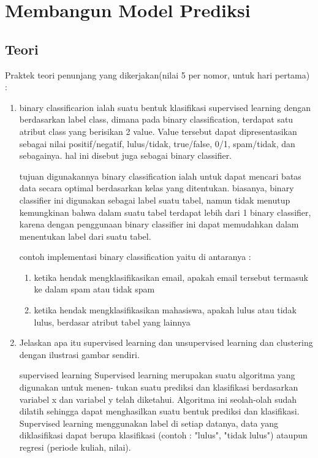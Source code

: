 \chapter{Membangun Model Prediksi}

\section{Teori}
Praktek teori penunjang yang dikerjakan(nilai 5 per nomor, untuk hari pertama) :
\begin{enumerate}
\item
binary classificarion ialah suatu bentuk klasifikasi supervised learning dengan berdasarkan label class, dimana pada binary classification, terdapat satu atribut class yang berisikan 2 value. Value tersebut dapat dipresentasikan sebagai nilai positif/negatif, lulus/tidak, true/false, 0/1, spam/tidak, dan sebagainya. hal ini disebut juga sebagai binary classifier.
\par tujuan digunakannya binary classification ialah untuk dapat mencari batas data secara optimal berdasarkan kelas yang ditentukan. biasanya, binary classifier ini digunakan sebagai label suatu tabel, namun tidak menutup kemungkinan bahwa dalam suatu tabel terdapat lebih dari 1 binary classifier, karena dengan penggunaan binary classifier ini dapat memudahkan dalam menentukan label dari suatu tabel.
\par contoh implementasi binary classification yaitu di antaranya :
\begin{enumerate}
    \item ketika hendak mengklasifikasikan email, apakah email tersebut termasuk ke dalam spam atau tidak spam
    \item ketika hendak mengklasifikasikan mahasiswa, apakah lulus atau tidak lulus, berdasar atribut tabel yang lainnya
\end{enumerate}
\item
Jelaskan apa itu supervised learning dan unsupervised learning dan clustering dengan ilustrasi gambar sendiri.
\par supervised learning
Supervised learning merupakan suatu algoritma yang digunakan untuk menen-
tukan suatu prediksi dan klasifikasi berdasarkan variabel x dan variabel y telah
diketahui. Algoritma ini seolah-olah sudah dilatih sehingga dapat menghasilkan
suatu bentuk prediksi dan klasifikasi. Supervised learning menggunakan label di setiap datanya, data yang diklasifikasi dapat berupa klasifikasi (contoh : "lulus", "tidak lulus") ataupun regresi (periode kuliah, nilai).

\end{enumerate}
